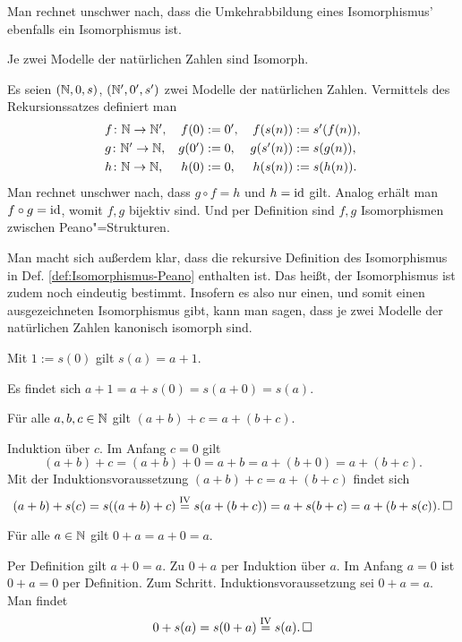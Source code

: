 \noindent
Man rechnet unschwer nach, dass die Umkehrabbildung eines Isomorphismus'
ebenfalls ein Isomorphismus ist.

\begin{Satz}\newlinefirst
Je zwei Modelle der natürlichen Zahlen sind Isomorph.
\end{Satz}
\begin{Beweis}
Es seien $(\mathbb N,0,s)$, $(\mathbb N',0',s')$ zwei Modelle der natürlichen Zahlen.
Vermittels des Rekursionssatzes definiert man
\[\begin{array}{lr@{\;}lr@{\;}l}
f\colon\N\to\N', & f(0) &:= 0', & f(s(n)) &:= s'(f(n)),\\[3pt]
g\colon\N'\to\N, & g(0') &:= 0, & g(s'(n)) &:= s(g(n)),\\[3pt]
h\colon\N\to\N, & h(0) &:= 0, & h(s(n)) &:= s(h(n)).
\end{array}\]
Man rechnet unschwer nach, dass $g\circ f = h$ und $h = \operatorname{id}$ gilt.
Analog erhält man $f\circ g = \operatorname{id}$, womit $f,g$ bijektiv sind.
Und per Definition sind $f,g$ Isomorphismen zwischen Peano"=Strukturen.\,\qedsymbol
\end{Beweis}

\noindent
Man macht sich außerdem klar, dass die rekursive Definition des
Isomorphismus in Def. \ref{def:Isomorphismus-Peano} enthalten ist.
Das heißt, der Isomorphismus ist zudem noch eindeutig bestimmt.
Insofern es also nur einen, und somit einen ausgezeichneten Isomorphismus
gibt, kann man sagen, dass je zwei Modelle der natürlichen Zahlen
kanonisch isomorph sind.

\begin{Satz}
Mit $1:=s(0)$ gilt $s(a)=a+1$.
\end{Satz}
\begin{Beweis}
Es findet sich $a+1 = a+s(0) = s(a+0) = s(a)$.\,\qedsymbol
\end{Beweis}

\begin{Satz}\newlinefirst
Für alle $a,b,c\in\mathbb N$ gilt $(a+b)+c = a+(b+c)$.
\end{Satz}
\begin{Beweis}
Induktion über $c$. Im Anfang $c=0$ gilt
\[(a+b)+c = (a+b)+0 = a+b = a+(b+0) = a+(b+c).\]
Mit der Induktionsvoraussetzung $(a+b)+c = a+(b+c)$ findet sich
\[(a+b)+s(c) = s((a+b)+c) \stackrel{\mathrm{IV}}= s(a+(b+c))
= a+s(b+c) = a+(b+s(c)).\,\Box\]
\end{Beweis}

\begin{Satz}%
\label{nat-zero}\newlinefirst
Für alle $a\in\mathbb N$ gilt $0+a = a+0 = a$.
\end{Satz}
\begin{Beweis}
Per Definition gilt $a+0=a$. Zu $0+a$ per Induktion über $a$.
Im Anfang $a=0$ ist $0+a = 0$ per Definition. Zum Schritt.
Induktionsvoraussetzung sei $0+a=a$. Man findet
\[0+s(a) = s(0+a) \stackrel{\mathrm{IV}}= s(a).\,\Box\]
\end{Beweis}

